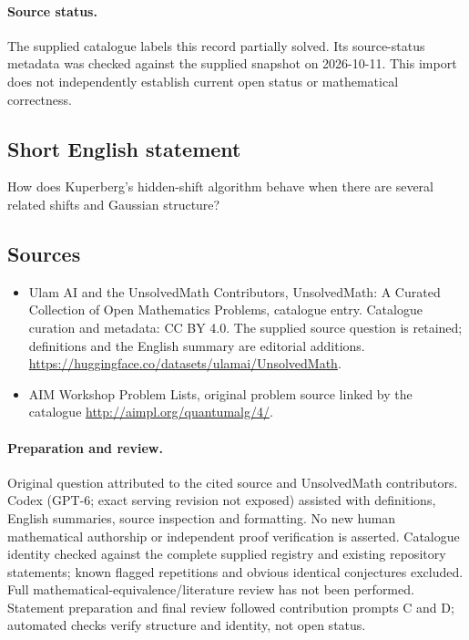 \documentclass[11pt]{article}
\begin{document}
\paragraph{Source status.}
The supplied catalogue labels this record partially solved. Its source-status metadata was checked against the supplied snapshot on 2026-10-11. This import does not independently establish current open status or mathematical correctness.
\subsection{Short English statement}
How does Kuperberg's hidden-shift algorithm behave when there are several related shifts and Gaussian structure?
\subsection{Sources}
\begin{itemize}
\item[S1] Ulam AI and the UnsolvedMath Contributors, UnsolvedMath: A Curated Collection of Open Mathematics Problems, catalogue entry. Catalogue curation and metadata: CC BY 4.0. The supplied source question is retained; definitions and the English summary are editorial additions.
\url{https://huggingface.co/datasets/ulamai/UnsolvedMath}.
\item[S2] AIM Workshop Problem Lists, original problem source linked by the catalogue
\url{http://aimpl.org/quantumalg/4/}.
\end{itemize}
\paragraph{Preparation and review.}
Original question attributed to the cited source and UnsolvedMath contributors. Codex (GPT-6; exact serving revision not exposed) assisted with definitions, English summaries, source inspection and formatting. No new human mathematical authorship or independent proof verification is asserted. Catalogue identity checked against the complete supplied registry and existing repository statements; known flagged repetitions and obvious identical conjectures excluded. Full mathematical-equivalence/literature review has not been performed. Statement preparation and final review followed contribution prompts C and D; automated checks verify structure and identity, not open status.
\label{end:statement}
\end{document}
